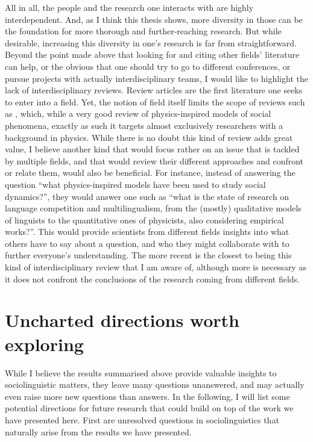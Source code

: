 \documentclass[../thesis.tex]{subfiles}
\begin{document}
All in all, the people and the research one interacts with are highly interdependent.
And, as I think this thesis shows, more diversity in those can be the foundation for
more thorough and further-reaching research. But while desirable, increasing this
diversity in one's research is far from straightforward. Beyond the point made above
that looking for and citing other fields' literature can help, or the obvious that one
should try to go to different conferences, or pursue projects with actually
interdisciplinary teams, I would like to highlight the lack of interdisciplinary
reviews. Review articles are the first literature one seeks to enter into a field. Yet,
the notion of field itself limits the scope of reviews such as
\cite{CastellanoStatisticalPhysics2009}, which, while a very good review of
physics-inspired models of social phenomena, exactly as such it targets almost
exclusively researchers with a background in physics. While there is no doubt this kind
of review adds great value, I believe another kind that would focus rather on an issue that is
tackled by multiple fields, and that would review their different approaches and
confront or relate them, would also be beneficial. For instance, instead of answering
the question ``what physics-inspired models have been used to study social dynamics?'',
they would answer one such as ``what is the state of research on language competition
and multilingualism, from the (mostly) qualitative models of linguists to the
quantitative ones of physicists, also considering empirical works?''. This would provide
scientists from different fields insights into what others have to say about a
question, and who they might collaborate with to further everyone's understanding. The
more recent \cite{BoissonneaultSystematicInterdisciplinary2021} is the closest to being
this kind of interdisciplinary review that I am aware of, although more is necessary as
it does not confront the conclusions of the research coming from different fields.


\section{Uncharted directions worth exploring}
While I believe the results summarised above provide valuable insights to
sociolinguistic matters, they leave many questions unanswered, and may actually even
raise more new questions than answers. In the following, I will list some potential
directions for future research that could build on top of the work we have presented
here. First are unresolved questions in sociolinguistics that naturally arise from the
results we have presented.
\end{document}
